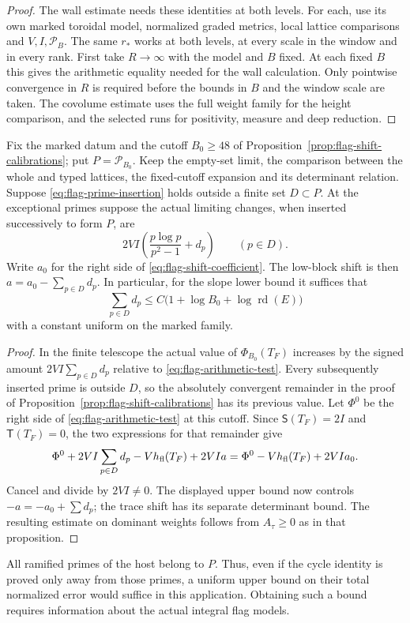 \begin{proof}
The wall estimate needs these identities at both levels. For each, use its own marked toroidal model, normalized graded metrics, local lattice comparisons and
\(V,I,\mathcal P_B\). The same \(r_*\) works at both levels, at
every scale in the window and in every rank. First take
\(R\to\infty\) with the model and \(B\) fixed. At each fixed \(B\) this gives the arithmetic equality needed for the wall calculation. Only pointwise convergence in \(R\) is required before the bounds in \(B\) and the window scale are taken. The covolume estimate uses the full weight family for the
height comparison, and the selected runs for positivity, measure and
deep reduction.
\end{proof}

\begin{auxlemma}\label{lem:flag-finite-defects}
Fix the marked datum and the cutoff \(B_0\ge48\) of
Proposition~\ref{prop:flag-shift-calibrations}; put \(P=\mathcal P_{B_0}\).
Keep the empty-set limit, the comparison between the whole and typed
lattices, the fixed-cutoff expansion and its determinant relation.
Suppose \eqref{eq:flag-prime-insertion} holds outside a finite set
\(D\subset P\). At the exceptional primes suppose the actual limiting
changes, when inserted successively to form \(P\), are
\[
 2VI\left(\frac{p\log p}{p^2-1}+d_p\right)\qquad(p\in D).
\]
Write \(a_0\) for the right side of \eqref{eq:flag-shift-coefficient}.
The low-block shift is then \(a=a_0-\sum_{p\in D}d_p\). In particular,
for the slope lower bound it suffices that
\[
  \sum_{p\in D}d_p\le C\bigl(1+\log B_0+\log\operatorname{rd}(E)\bigr)
\]
with a constant uniform on the marked family.
\end{auxlemma}
\begin{proof}
In the finite telescope the actual value of \(\Phi_{B_0}(T_F)\)
increases by the signed amount \(2VI\sum_{p\in D}d_p\) relative to
\eqref{eq:flag-arithmetic-test}. Every subsequently inserted prime is
outside \(D\), so the absolutely convergent remainder in the proof of
Proposition~\ref{prop:flag-shift-calibrations} has its previous value.
Let \(\Phi^0\) be the right side of \eqref{eq:flag-arithmetic-test}
at this cutoff. Since \(\mathsf S(T_F)=2I\) and \(\mathsf T(T_F)=0\),
the two expressions for that remainder give
\[
   \Phi^0 + 2VI\sum_{p\in D}d_p - Vh_{\rm fl}(T_F)+2VIa
       =\Phi^0 -Vh_{\rm fl}(T_F)+2VIa_0 .
\]
Cancel and divide by \(2VI\ne0\). The displayed upper bound now
controls \(-a=-a_0+\sum d_p\); the trace shift has its separate
determinant bound. The resulting estimate on dominant weights follows
from \(A_\tau\ge0\) as in that proposition.
\end{proof}

All ramified primes of the host belong to \(P\). Thus, even if the cycle
identity is proved only away from those primes, a uniform upper bound on
their total normalized error would suffice in this application. Obtaining
such a bound requires information about the actual integral flag models.

